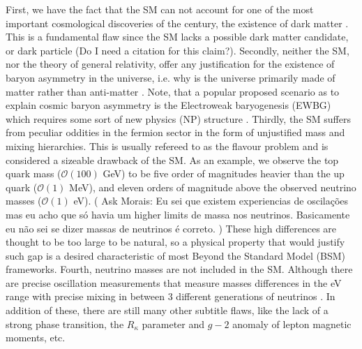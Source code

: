 First, we have the fact that the SM can not account for one of the most important cosmological discoveries of the century, the existence of dark matter \cite{Bergstr_m_2000}. 
%
This is a fundamental flaw since the SM lacks a possible dark matter candidate, or dark particle {\color{red} (Do I need a citation for this claim?).} 
%
Secondly, neither the SM,  nor the theory of general relativity, offer any justification for the existence of baryon asymmetry in the universe, i.e. why is the universe primarily made of matter rather than anti-matter \cite{book_Baryion}. 
%
Note, that a popular proposed scenario as to explain cosmic baryon asymmetry is the Electroweak baryogenesis (EWBG) which requires some sort of new physics (NP) structure \cite{Morrissey2012}. 
%
Thirdly, the SM suffers from peculiar oddities in the fermion sector in the form of unjustified mass and mixing hierarchies. This is usually refereed to as the flavour problem and is considered a sizeable drawback of the SM. 
%
As an example, we observe the top quark mass ($\mathcal{O}(100)$ GeV) to be five order of magnitudes heavier than the up quark ($\mathcal{O}(1)$ MeV), and eleven orders of magnitude above the observed neutrino masses ($\mathcal{O}(1)$ eV).
%
{ ( \color{red} Ask Morais: Eu sei que existem experiencias de oscilações mas eu acho que só havia um higher limits de massa nos neutrinos. Basicamente eu não sei se dizer massas de neutrinos é correto. ) }
%
These high differences are thought to be too large to be natural, so a physical property that would justify such gap is a desired characteristic of most Beyond the Standard Model (BSM) frameworks. 
%
Fourth, neutrino masses are not included in the SM. Although there are precise oscillation measurements that measure masses differences in the eV range with precise mixing in between 3 different generations of neutrinos \cite{PhysRevD.89.013001}. 
%
In addition of these, there are still many other subtitle flaws, like the lack of a strong phase transition, the $R_{\kappa}$ parameter and $g-2$ anomaly of lepton magnetic moments, etc. 

